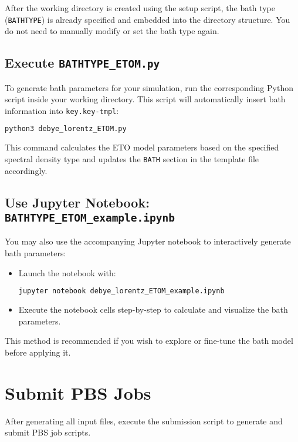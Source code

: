\documentclass{article}
\begin{document}
After the working directory is created using the setup script, the bath type (\texttt{BATHTYPE}) is already specified and embedded into the directory structure. You do not need to manually modify or set the bath type again.

\subsection*{Execute \texttt{BATHTYPE\_ETOM.py}}

To generate bath parameters for your simulation, run the corresponding Python script inside your working directory. This script will automatically insert bath information into \texttt{key.key-tmpl}:

\begin{lstlisting}[language=bash]
python3 debye_lorentz_ETOM.py
\end{lstlisting}

This command calculates the ETO model parameters based on the specified spectral density type and updates the \texttt{BATH} section in the template file accordingly.

\subsection*{Use Jupyter Notebook: \texttt{BATHTYPE\_ETOM\_example.ipynb}}

You may also use the accompanying Jupyter notebook to interactively generate bath parameters:

\begin{itemize}
    \item Launch the notebook with:
    \begin{lstlisting}[language=bash]
    jupyter notebook debye_lorentz_ETOM_example.ipynb
    \end{lstlisting}
    \item Execute the notebook cells step-by-step to calculate and visualize the bath parameters.
\end{itemize}

This method is recommended if you wish to explore or fine-tune the bath model before applying it.

\newpage 

\section{Submit PBS Jobs}

After generating all input files, execute the submission script to generate and submit PBS job scripts.
\end{document}
